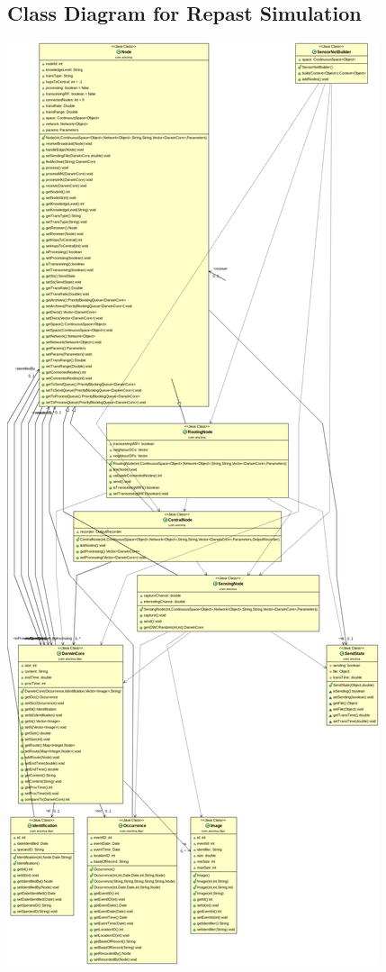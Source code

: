 \begin{appendices}
\chapter{Class Diagram for Repast Simulation}\label{appendix:sims:class}
\includegraphics[width=\textwidth, height=\textheight]{App/figures/classd}


\end{appendices}
